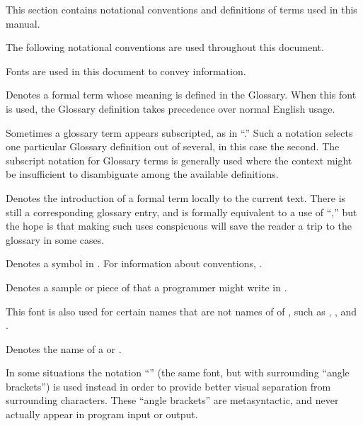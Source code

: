 
This section contains notational conventions and definitions of terms
used in this manual.


The following notational conventions are used throughout this document.


Fonts are used in this document to convey information.

\beginlist


Denotes a formal term whose meaning is defined in the Glossary.
When this font is used, the Glossary definition takes precedence 
over normal English usage.

Sometimes a glossary term appears subscripted, 
as in ``.''  
Such a notation selects one particular Glossary definition out of several,
in this case the second.
The subscript notation for Glossary terms is generally used where the
context might be insufficient to disambiguate among the available definitions.


Denotes the introduction of a formal term locally to the current text.
There is still a corresponding glossary entry, and is formally equivalent
to a use of ``,'' but the hope is that making such uses 
conspicuous will save the reader a trip to the glossary in some cases.

                           
Denotes a symbol in .
For information about  conventions,
\seesection\CaseInSymbols.


Denotes a sample  or piece of  that a programmer
might write in \clisp.

This font is also used for certain  names that are not
names of  of , 
such as ,
         ,
    and .


Denotes the name of a  or .

In some situations the notation ``'' (\ie the same font,
but with surrounding ``angle brackets'') is used instead in order to
provide better visual separation from surrounding characters.  These
``angle brackets'' are metasyntactic, and never actually appear in program
input or output.

